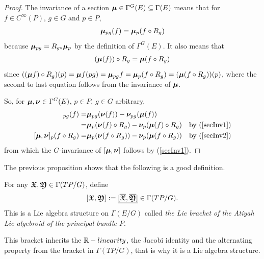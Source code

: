 \begin{proof}
The invariance of a section $\bm{\mu} \in \Gamma^G(E) \subseteq \Gamma(E)$ means that for $f \in C^\infty(P)$, $g \in G$ and $p \in P$,  
\begin{align} \label{secInv1}
\bm{\mu}_{pg} (f) = \bm{\mu}_p(f \circ R_g)\end{align} 
because $\bm{\mu}_{pg} = R_{g*} \bm{\mu}_p$ by the definition of $\Gamma^G(E)$. It also means that 
\begin{align}\label{secInv2}
(\bm{\mu} (f)) \circ R_g = \bm{\mu}(f \circ R_g)
\end{align}
since $((\bm{\mu} f) \circ R_g)(p) = \bm{\mu} f(pg) = \bm{\mu}_{pg} f = \bm{\mu}_p(f \circ R_g) = (\bm{\mu}(f \circ R_g))(p)$, where the second to last equation follows from the invariance of $\bm{\mu}$.
    
So, for $\bm{\mu}, \bm{\nu} \in \Gamma^G(E)$, $p \in P$, $g \in G$ arbitrary,
\begin{align*}
    [\sect \mu, \sect \nu]_{pg}(f)
        =& \sect \mu_{pg}(\sect \nu(f)) - \sect \nu_{pg}(\sect \mu (f))\\
        =& \sect \mu_{p}(\sect \nu(f) \circ R_g) - \sect \nu_{p}(\sect \mu (f) \circ R_g) & \textrm{by } (\ref{secInv1})\\
    [\sect \mu, \sect \nu]_p (f \circ R_g) =& \sect \mu_p(\sect \nu(f \circ R_g)) - \sect \nu_p(\sect \mu(f \circ R_g)) & \textrm{by } (\ref{secInv2})
\end{align*}
from which the $G$-invariance of $[\bm{\mu}, \bm{\nu}]$ follows by (\ref{secInv1}).
\end{proof}

The previous proposition shows that the following is a good definition.

\begin{definition}\label{AtiyahBracket}
For any $\bm{\mathfrak{X}}, \bm{\mathfrak{Y}} \in \Gamma(TP/G)$, define 
\begin{align} \label{bracketDefn}
    [\bm{\mathfrak{X}}, \bm{\mathfrak{Y}}] := \underline{[\overline{\bm{\mathfrak{X}}}, \overline{\bm{\mathfrak{Y}}}]} \in \Gamma(TP/G).
\end{align}
This is a Lie algebra structure on $\Gamma(E/G)$ called \emph{the Lie bracket of the Atiyah Lie algebroid of the principal bundle $P$}.
\end{definition}

This bracket inherits the $\mathbb{R}-linearity$, the Jacobi identity and the alternating property from the bracket in $\Gamma(TP/G)$, that is why it is a Lie algebra structure.


